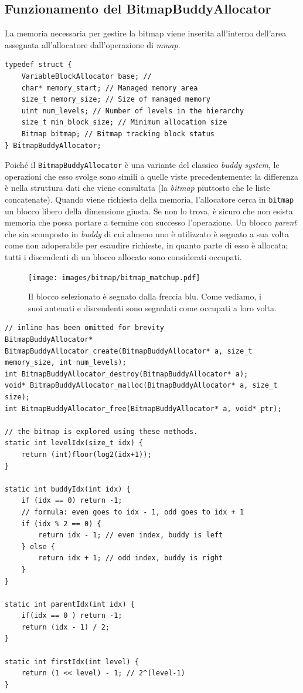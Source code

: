 \subsection*{Funzionamento del BitmapBuddyAllocator}
La memoria necessaria per gestire la bitmap viene inserita all'interno dell'area assegnata all'allocatore dall'operazione di \textit{mmap}.
\begin{lstlisting}
typedef struct {
    VariableBlockAllocator base; // 
    char* memory_start; // Managed memory area
    size_t memory_size; // Size of managed memory
    uint num_levels; // Number of levels in the hierarchy
    size_t min_block_size; // Minimum allocation size
    Bitmap bitmap; // Bitmap tracking block status
} BitmapBuddyAllocator;
\end{lstlisting}

Poiché il \texttt{BitmapBuddyAllocator} è una variante del classico \textit{buddy system}, le operazioni che esso svolge sono simili a quelle viste precedentemente: la differenza è nella struttura dati che viene consultata (la \textit{bitmap} piuttosto che le liste concatenate). Quando viene richiesta della memoria, l’allocatore cerca in \texttt{bitmap} un blocco libero della dimensione giusta. Se non lo trova, è sicuro che non esista memoria che possa portare a termine con successo l'operazione. Un blocco \textit{parent} che sia scomposto in \textit{buddy} di cui almeno uno è utilizzato è segnato a sua volta come non adoperabile per esaudire richieste, in quanto parte di esso è allocata; tutti i discendenti di un blocco allocato sono considerati occupati.

\begin{figure}[H]
    \centering
    \texttt{[image: images/bitmap/bitmap\_matchup.pdf]}
    \caption{Il blocco selezionato è segnato dalla freccia blu. Come vediamo, i suoi antenati e discendenti sono segnalati come occupati a loro volta.}
    \label{fig:bitmap_matchup}
\end{figure}


\begin{lstlisting}
// inline has been omitted for brevity
BitmapBuddyAllocator* BitmapBuddyAllocator_create(BitmapBuddyAllocator* a, size_t memory_size, int num_levels);
int BitmapBuddyAllocator_destroy(BitmapBuddyAllocator* a);
void* BitmapBuddyAllocator_malloc(BitmapBuddyAllocator* a, size_t size);
int BitmapBuddyAllocator_free(BitmapBuddyAllocator* a, void* ptr);

// the bitmap is explored using these methods.
static int levelIdx(size_t idx) {
    return (int)floor(log2(idx+1));
}

static int buddyIdx(int idx) {
    if (idx == 0) return -1;
    // formula: even goes to idx - 1, odd goes to idx + 1
    if (idx % 2 == 0) {
        return idx - 1; // even index, buddy is left
    } else {
        return idx + 1; // odd index, buddy is right
    }
}

static int parentIdx(int idx) {
    if(idx == 0 ) return -1;
    return (idx - 1) / 2;
}

static int firstIdx(int level) {
    return (1 << level) - 1; // 2^(level-1)
}

\end{lstlisting}

